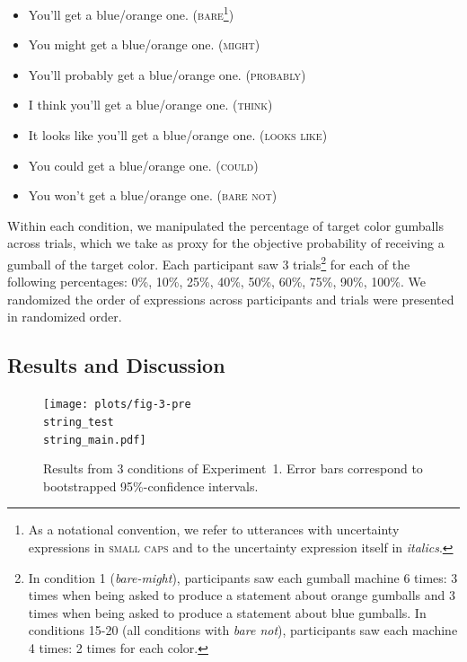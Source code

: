  \begin{itemize}
\item You'll get a blue/orange one. (\textsc{bare}\footnote{As a notational convention, we refer to utterances with uncertainty expressions in \textsc{small caps} and to the uncertainty expression itself in \textit{italics}. })
\item You might get a blue/orange one. (\textsc{might})
\item You'll probably get a blue/orange one. (\textsc{probably})
\item I think you'll get a blue/orange one. (\textsc{think})
\item It looks like you'll get a blue/orange one. (\textsc{looks like})
\item You could get a blue/orange one. (\textsc{could})
\item You won't get a blue/orange one. (\textsc{bare not})
\end{itemize}


\noindent Within each condition, we manipulated the percentage of target color gumballs across trials, which we take as proxy for the objective probability of receiving a gumball of the target color. 
Each participant saw 3 trials\footnote{In condition 1 (\textit{bare-might}), participants saw each gumball machine 6 times: 3 times when being asked to produce a statement about orange gumballs and 3 times when being asked to produce a statement about blue gumballs. In conditions 15-20 (all conditions with \textit{bare not}), participants saw each machine 4 times: 2 times for each color.} 
for each of the following percentages: 0\%, 10\%, 25\%, 40\%, 50\%, 60\%, 75\%, 90\%, 100\%. We randomized the order of expressions across participants and trials were presented in randomized order.

\subsection{Results and Discussion}

\begin{figure}
\texttt{[image: plots/fig-3-pre\\string\_test\\string\_main.pdf]} 
\caption{Results from 3 conditions of Experiment~1. Error bars correspond to bootstrapped 95\%-confidence intervals. \label{fig:norming-results-main} }
\end{figure}

